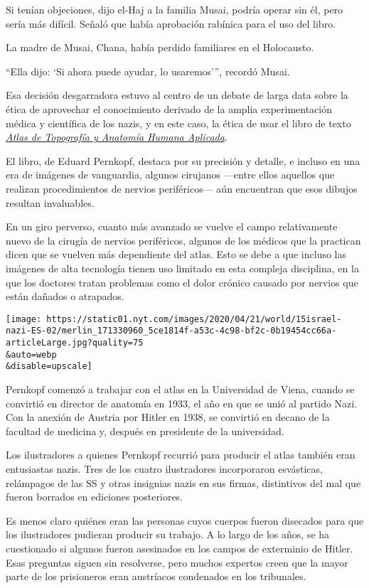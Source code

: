 Si tenían objeciones, dijo el-Haj a la familia Musai, podría operar sin
él, pero sería más difícil. Señaló que había aprobación rabínica para el
uso del libro.

La madre de Musai, Chana, había perdido familiares en el Holocausto.

``Ella dijo: `Si ahora puede ayudar, lo usaremos''', recordó Musai.

Esa decisión desgarradora estuvo al centro de un debate de larga data
sobre la ética de aprovechar el conocimiento derivado de la amplia
experimentación médica y científica de los nazis, y en este caso, la
ética de usar el libro de texto
\href{https://www.nytimes.com/1996/11/26/science/doctors-question-use-of-nazi-s-medical-atlas.html}{\emph{Atlas
de Topografía y Anatomía Humana Aplicada}}.

El libro, de Eduard Pernkopf, destaca por su precisión y detalle, e
incluso en una era de imágenes de vanguardia, algunos cirujanos ---entre
ellos aquellos que realizan procedimientos de nervios periféricos--- aún
encuentran que esos dibujos resultan invaluables.

En un giro perverso, cuanto más avanzado se vuelve el campo
relativamente nuevo de la cirugía de nervios periféricos, algunos de los
médicos que la practican dicen que se vuelven más dependiente del atlas.
Esto se debe a que incluso las imágenes de alta tecnología tienen uso
limitado en esta compleja disciplina, en la que los doctores tratan
problemas como el dolor crónico causado por nervios que están dañados o
atrapados.

\texttt{[image: https://static01.nyt.com/images/2020/04/21/world/15israel-nazi-ES-02/merlin\_171330960\_5ce1814f-a53c-4c98-bf2c-0b19454cc66a-articleLarge.jpg?quality=75\\\&auto=webp\\\&disable=upscale]}

Pernkopf comenzó a trabajar con el atlas en la Universidad de Viena,
cuando se convirtió en director de anatomía en 1933, el año en que se
unió al partido Nazi. Con la anexión de Austria por Hitler en 1938, se
convirtió en decano de la facultad de medicina y, después en presidente
de la universidad.

Los ilustradores a quienes Pernkopf recurrió para producir el atlas
también eran entusiastas nazis. Tres de los cuatro ilustradores
incorporaron esvásticas, relámpagos de las SS y otras insignias nazis en
sus firmas, distintivos del mal que fueron borrados en ediciones
posteriores.

Es menos claro quiénes eran las personas cuyos cuerpos fueron disecados
para que los ilustradores pudieran producir su trabajo. A lo largo de
los años, se ha cuestionado si algunos fueron asesinados en los campos
de exterminio de Hitler. Esas preguntas siguen sin resolverse, pero
muchos expertos creen que la mayor parte de los prisioneros eran
austríacos condenados en los tribunales.

